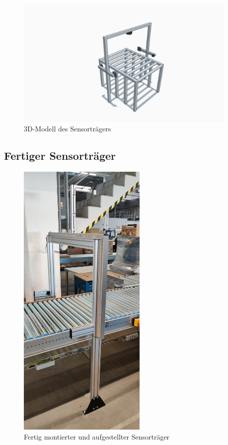 \begin{figure}[htpb]
  \centering
  \includegraphics[trim={8cm 0 8cm 0}, clip, width=0.95\textwidth]{./files/Sensortraeger/Skizze_Sensor_Traeger_3D_verdreht.png}
  \caption{3D-Modell des Sensorträgers}
  \label{appendix:fig:sensor_traeger_3d}
\end{figure}


\newpage
\subsection{Fertiger Sensorträger}

\begin{figure}[h!]
  \centering
  \includegraphics[width=0.55\textwidth]{./pics/Sensortraeger.jpeg}
  \caption{Fertig montierter und aufgestellter Sensorträger}
  \label{appendix:fig:sensor_traeger_fertig}
\end{figure}


